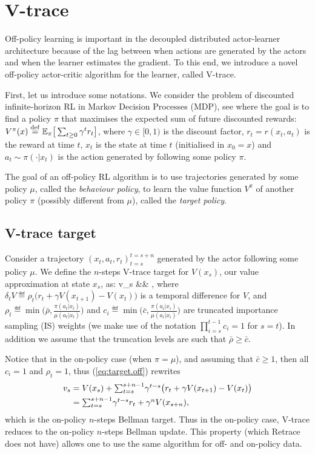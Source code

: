 \section{V-trace}
\label{sec:v-trace}

Off-policy learning is important in the decoupled distributed actor-learner architecture because of the lag between when actions are generated by the actors and when the learner estimates the gradient. To this end, we introduce a novel off-policy actor-critic algorithm for the learner, called V-trace. 

First, let us introduce some notations. We consider the problem of discounted infinite-horizon RL in Markov Decision Processes (MDP), see \cite{Puterman:1994,sutton-barto98} where the goal is to find a policy $\pi$ that maximises the expected sum of future discounted rewards:
$V^{\pi}(x) \stackrel{\rm def}{=}\mathbb{E}_{\pi}\big[\sum_{t\geq 0} \gamma^t r_t\big]$, where $\gamma\in[0,1)$ is the discount factor, $r_t = r(x_t, a_t)$ is the reward at time $t$, $x_t$ is the state at time $t$ (initialised in $x_0=x$) and $a_t\sim\pi(\cdot|x_t)$ is the action generated by following some policy $\pi$. 

The goal of an off-policy RL algorithm is to use trajectories generated by some policy $\mu$, called the {\em behaviour policy}, to learn the value function $V^{\pi}$ of another policy $\pi$ (possibly different from $\mu$), called the {\em target policy}. 

\subsection{V-trace target}
Consider a trajectory $\left(x_t, a_t, r_t\right)_{t=s}^{t=s+n}$ generated by the actor following some policy $\mu$. We define the $n$-steps V-trace target for $V(x_s)$, our value approximation at state $x_s$, as:
\beqa
v_s &\eqdef& , \label{eq:target.off}
\eeqa
where $\delta_t V \eqdef \rho_t \big(r_t+\gamma V(x_{t+1})-V(x_t)\big)$  is a temporal difference for $V$, and  $\rho_t\eqdef\min\big(\bar\rho, \frac{\pi(a_t|x_t)}{\mu(a_t|x_t)}\big)$ and $c_i\eqdef\min\big(\bar c, \frac{\pi(a_i|x_i)}{\mu(a_i|x_i)}\big)$ are truncated importance sampling (IS) weights (we make use of the notation $\prod_{i=s}^{t-1} c_i=1$ for $s=t$). In addition we assume that the truncation levels are such that $\bar \rho\geq \bar c$.

Notice that in the on-policy case (when $\pi=\mu$), and assuming that $\bar c \geq 1$, then all $c_i=1$ and $\rho_t=1$, thus   (\ref{eq:target.off}) rewrites
\begin{align}
v_s &= V(x_s) + \textstyle{\sum_{t=s}^{s+n-1}} \gamma^{t-s} \big(r_t+\gamma V(x_{t+1})-V(x_t)\big) \notag \\
&= 
\label{eq:target.on}
\textstyle{\sum_{t=s}^{s+n-1}} \gamma^{t-s} r_t + \gamma^{n} V(x_{s+n}),
\end{align}
which is the on-policy $n$-steps Bellman target. Thus in the on-policy case, V-trace reduces to the on-policy $n$-steps Bellman update. This property (which Retrace \cite{munos2016safe} does not have) allows one to use the same algorithm for off- and on-policy data. 
 
